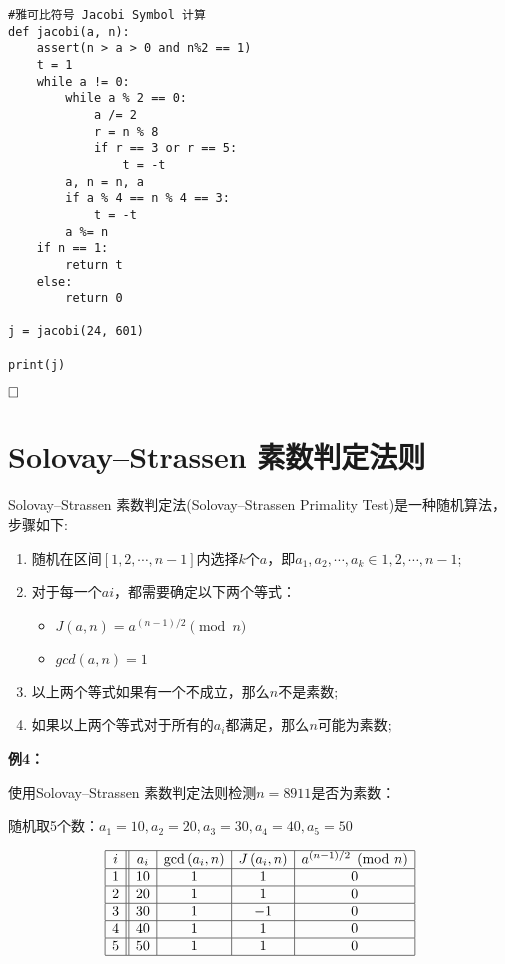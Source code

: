 \documentclass{article}
\begin{document}
\begin{lstlisting}
#雅可比符号 Jacobi Symbol 计算
def jacobi(a, n):
    assert(n > a > 0 and n%2 == 1)
    t = 1
    while a != 0:
        while a % 2 == 0:
            a /= 2
            r = n % 8
            if r == 3 or r == 5:
                t = -t
        a, n = n, a
        if a % 4 == n % 4 == 3:
            t = -t
        a %= n
    if n == 1:
        return t
    else:
        return 0
    
j = jacobi(24, 601)

print(j)
\end{lstlisting}
$\hfill\square$ 

\section{Solovay–Strassen 素数判定法则}

Solovay–Strassen 素数判定法(Solovay–Strassen Primality Test)是一种随机算法，步骤如下:
\begin{enumerate}
\item 随机在区间$[1,2,\cdots,n-1]$内选择$k$个$a$，即$a_1,a_2,\cdots,a_k \in {1,2,\cdots,n-1}$;
\item 对于每一个$ai$，都需要确定以下两个等式：
\begin{itemize}
\item $J(a,n) = a^{(n-1)/2} \pmod{n}$
\item $gcd(a,n) = 1$
\end{itemize}
\item 以上两个等式如果有一个不成立，那么$n$不是素数;
\item 如果以上两个等式对于所有的$a_i$都满足，那么$n$可能为素数;
\end{enumerate}



\textbf{例4：}


使用Solovay–Strassen 素数判定法则检测$n = 8911$是否为素数：

随机取5个数：$a_1= 10, a_2=20,a_3=30,a_4=40,a_5 = 50$

$$
\begin{array}{|c||c|c|c|c|}
\hline i & a_{i} & \operatorname{gcd}\left(a_{i}, n\right) & J\left(a_{i}, n\right) & a^{(n-1) / 2} \pmod{n} \\
\hline 1 & 10& 1& 1& 0 \\
\hline 2 & 20& 1& 1& 0  \\
\hline 3 & 30& 1& -1& 0\\
\hline 4 & 40& 1& 1& 0 \\
\hline 5 & 50& 1& 1& 0 \\
\hline
\end{array}
$$
\end{document}
